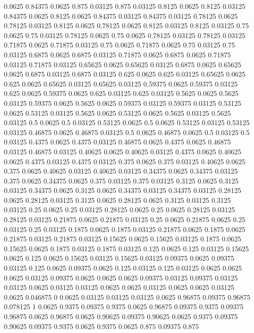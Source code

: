 0.0625 0.84375
0.0625 0.875
0.03125 0.875
0.03125 0.8125
0.0625 0.8125
0.03125 0.84375
0.0625 0.8125
0.0625 0.84375
0.03125 0.84375
0.03125 0.78125
0.0625 0.78125
0.03125 0.8125
0.0625 0.78125
0.0625 0.8125
0.03125 0.8125
0.03125 0.75
0.0625 0.75
0.03125 0.78125
0.0625 0.75
0.0625 0.78125
0.03125 0.78125
0.03125 0.71875
0.0625 0.71875
0.03125 0.75
0.0625 0.71875
0.0625 0.75
0.03125 0.75
0.03125 0.6875
0.0625 0.6875
0.03125 0.71875
0.0625 0.6875
0.0625 0.71875
0.03125 0.71875
0.03125 0.65625
0.0625 0.65625
0.03125 0.6875
0.0625 0.65625
0.0625 0.6875
0.03125 0.6875
0.03125 0.625
0.0625 0.625
0.03125 0.65625
0.0625 0.625
0.0625 0.65625
0.03125 0.65625
0.03125 0.59375
0.0625 0.59375
0.03125 0.625
0.0625 0.59375
0.0625 0.625
0.03125 0.625
0.03125 0.5625
0.0625 0.5625
0.03125 0.59375
0.0625 0.5625
0.0625 0.59375
0.03125 0.59375
0.03125 0.53125
0.0625 0.53125
0.03125 0.5625
0.0625 0.53125
0.0625 0.5625
0.03125 0.5625
0.03125 0.5
0.0625 0.5
0.03125 0.53125
0.0625 0.5
0.0625 0.53125
0.03125 0.53125
0.03125 0.46875
0.0625 0.46875
0.03125 0.5
0.0625 0.46875
0.0625 0.5
0.03125 0.5
0.03125 0.4375
0.0625 0.4375
0.03125 0.46875
0.0625 0.4375
0.0625 0.46875
0.03125 0.46875
0.03125 0.40625
0.0625 0.40625
0.03125 0.4375
0.0625 0.40625
0.0625 0.4375
0.03125 0.4375
0.03125 0.375
0.0625 0.375
0.03125 0.40625
0.0625 0.375
0.0625 0.40625
0.03125 0.40625
0.03125 0.34375
0.0625 0.34375
0.03125 0.375
0.0625 0.34375
0.0625 0.375
0.03125 0.375
0.03125 0.3125
0.0625 0.3125
0.03125 0.34375
0.0625 0.3125
0.0625 0.34375
0.03125 0.34375
0.03125 0.28125
0.0625 0.28125
0.03125 0.3125
0.0625 0.28125
0.0625 0.3125
0.03125 0.3125
0.03125 0.25
0.0625 0.25
0.03125 0.28125
0.0625 0.25
0.0625 0.28125
0.03125 0.28125
0.03125 0.21875
0.0625 0.21875
0.03125 0.25
0.0625 0.21875
0.0625 0.25
0.03125 0.25
0.03125 0.1875
0.0625 0.1875
0.03125 0.21875
0.0625 0.1875
0.0625 0.21875
0.03125 0.21875
0.03125 0.15625
0.0625 0.15625
0.03125 0.1875
0.0625 0.15625
0.0625 0.1875
0.03125 0.1875
0.03125 0.125
0.0625 0.125
0.03125 0.15625
0.0625 0.125
0.0625 0.15625
0.03125 0.15625
0.03125 0.09375
0.0625 0.09375
0.03125 0.125
0.0625 0.09375
0.0625 0.125
0.03125 0.125
0.03125 0.0625
0.0625 0.0625
0.03125 0.09375
0.0625 0.0625
0.0625 0.09375
0.03125 0.09375
0.03125 0.03125
0.0625 0.03125
0.03125 0.0625
0.0625 0.03125
0.0625 0.0625
0.03125 0.0625
0.046875 0
0.0625 0.03125
0.03125 0.03125
0.0625 0.96875
0.09375 0.96875
0.078125 1
0.0625 0.9375
0.09375 0.9375
0.0625 0.96875
0.09375 0.9375
0.09375 0.96875
0.0625 0.96875
0.0625 0.90625
0.09375 0.90625
0.0625 0.9375
0.09375 0.90625
0.09375 0.9375
0.0625 0.9375
0.0625 0.875
0.09375 0.875
